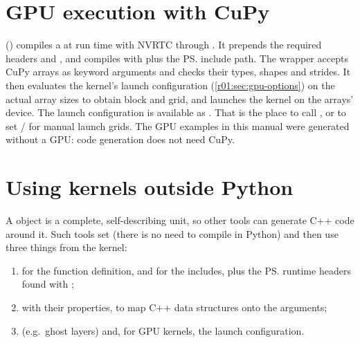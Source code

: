 \section{GPU execution with CuPy}\label{r01:sec:gpu-execution}

 () compiles a  at run time with
NVRTC through . It prepends the required headers and
, and compiles with  plus the \ps{}
include path. The wrapper  accepts CuPy arrays as keyword
arguments and checks their types, shapes and strides. It then evaluates the kernel's
launch configuration (\cref{r01:sec:gpu-options}) on the actual array sizes to obtain block
and grid, and launches the kernel on the arrays' device. The launch configuration is
available as . That is the place to call
, or to set / for manual
launch grids. The GPU examples in this manual were generated without a GPU: code
generation does not need CuPy.

\section{Using kernels outside Python}\label{r01:sec:external-use}

A  object is a complete, self-describing unit, so other tools can generate
C++ code around it. Such tools set  (there is no need to
compile in Python) and then use three things from the kernel:
\begin{enumerate}
  \item {} for the function definition, and
         for the includes, plus the \ps{} runtime headers
        found with ;
  \item {} with their properties, to map C++ data structures onto
        the arguments;
  \item {} (e.g.\ ghost layers) and, for GPU kernels, the launch
        configuration.
\end{enumerate}

